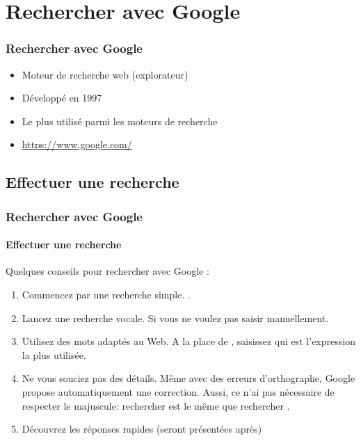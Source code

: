 \documentclass[xcolor=table]{beamer}
\begin{document}
\section{Rechercher avec Google}

\begin{frame}
\frametitle{Rechercher avec Google}

\begin{itemize}
	\item Moteur de recherche web (explorateur)
	\item Développé en 1997
	\item Le plus utilisé parmi les moteurs de recherche
	\item \url{https://www.google.com/}
\end{itemize}

\end{frame}

\subsection{Effectuer une recherche}

\begin{frame}
\frametitle{Rechercher avec Google}
\framesubtitle{Effectuer une recherche}

Quelques conseils pour rechercher avec Google : 
\begin{enumerate}
	\item Commencez par une recherche simple. .
	
	\item Lancez une recherche vocale. Si vous ne voulez pas saisir manuellement.
	
	\item Utilisez des mots adaptés au Web. A la place de , saisissez  qui est l'expression la plus utilisée.
	
	\item Ne vous souciez pas des détails. Même avec des erreurs d'orthographe, Google propose automatiquement une correction. Aussi, ce n'ai pas nécessaire de respecter le majuscule: rechercher  est le même que rechercher .
	
	\item Découvrez les réponses rapides (seront présentées après)
\end{enumerate}

\end{frame}
\end{document}
